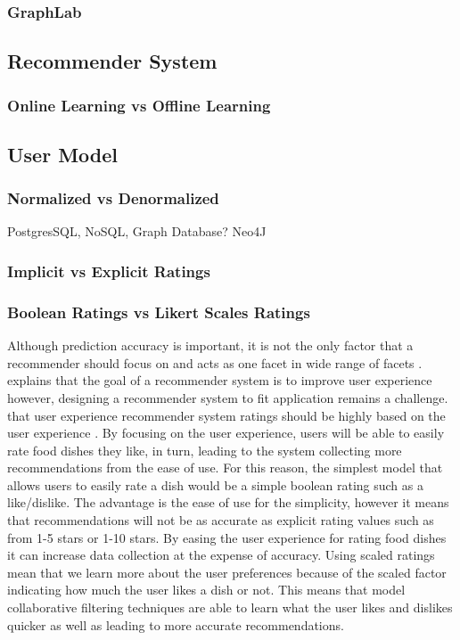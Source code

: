 \subsubsection{GraphLab}

\subsection{Recommender System}
\subsubsection{Online Learning vs Offline Learning}

\subsection{User Model}

\subsubsection{Normalized vs Denormalized}

PostgresSQL, NoSQL, Graph Database? Neo4J

\subsubsection{Implicit vs Explicit Ratings}

\subsubsection{Boolean Ratings vs Likert Scales Ratings}

Although prediction accuracy is important, it is not the only factor that a recommender should focus on and acts as one facet in wide range of facets \cite{martin2009recsys}. \citeauthor{martin2009recsys} explains that the goal of a recommender system is to improve user experience however, designing a recommender system to fit application remains a challenge.  that user experience recommender system ratings should be highly based on the user experience \cite{martin2009recsys}. By focusing on the user experience, users will be able to easily rate food dishes they like, in turn, leading to the system collecting more recommendations from the ease of use. For this reason, the simplest model that allows users to easily rate a dish would be a simple boolean rating such as a like/dislike. The advantage is the ease of use for the simplicity, however it means that recommendations will not be as accurate as explicit rating values such as from 1-5 stars or 1-10 stars. By easing the user experience for rating food dishes it can increase data collection at the expense of accuracy. Using scaled ratings mean that we learn more about the user preferences because of the scaled factor indicating how much the user likes a dish or not. This means that model collaborative filtering techniques are able to learn what the user likes and dislikes quicker as well as leading to more accurate recommendations. 


